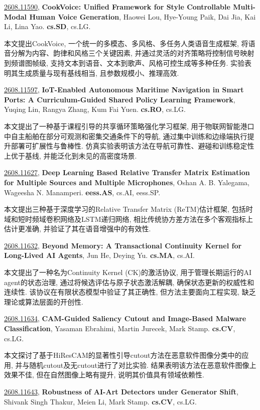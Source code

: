 \documentclass[9pt, a4paper]{article}
\theoremstyle{plain}
\theoremstyle{definition}
\theoremstyle{remark}
\newcommand{\arxivwithtarget}[3]{\hypertarget{#1}{}\href{https://arxiv.org/abs/#1}{#1}, \textbf{\textcolor{arxivblue}{#2}}, #3. }
\begin{document}
\arxivwithtarget{2608.11590}{CookVoice: Unified Framework for Style Controllable Multi-Modal Human Voice Generation}{Haowei Lou, Hye-Young Paik, Dai Jia, Kai Li, Lina Yao}\textbf{cs.SD}, cs.LG.

本文提出CookVoice, 一个统一的多模态、多风格、多任务人类语音生成框架, 将语音分解为内容、韵律和风格三个关键因素, 并通过灵活的对齐策略将控制信号映射到频谱图帧级, 支持文本到语音、文本到歌声、风格可控生成等多种任务. 实验表明其生成质量与现有基线相当, 且参数规模小、推理高效.


\arxivwithtarget{2608.11597}{IoT-Enabled Autonomous Maritime Navigation in Smart Ports: A Curriculum-Guided Shared Policy Learning Framework}{Yuqing Lin, Rangya Zhang, Kum Fai Yuen}\textbf{cs.RO}, cs.LG.

本文提出了一种基于课程引导的共享循环策略强化学习框架, 用于物联网智能港口中自主船舶在部分可观测和密集交通条件下的导航, 通过集中训练和边缘端执行提升部署可扩展性与鲁棒性. 仿真实验表明该方法在导航可靠性、避碰和训练稳定性上优于基线, 并能泛化到未见的高密度场景.


\arxivwithtarget{2608.11627}{Deep Learning Based Relative Transfer Matrix Estimation for Multiple Sources and Multiple Microphones}{Oshan A. B. Yalegama, Wageesha N. Manamperi}\textbf{eess.AS}, cs.AI, eess.SP.

本文提出三种基于深度学习的Relative Transfer Matrix (ReTM)估计框架, 包括时域和短时频域卷积网络及LSTM递归网络, 相比传统协方差方法在多个客观指标上估计更准确, 并验证了其在语音增强中的有效性.


\arxivwithtarget{2608.11632}{Beyond Memory: A Transactional Continuity Kernel for Long-Lived AI Agents}{Jun He, Deying Yu}\textbf{cs.MA}, cs.AI.

本文提出了一种名为Continuity Kernel (CK)的激活协议, 用于管理长期运行的AI agent的状态治理, 通过将候选评估与原子状态激活解耦, 确保状态更新的权威性和连续性. 该协议在有限状态模型中验证了其正确性, 但方法主要面向工程实现, 缺乏理论或算法层面的开创性.


\arxivwithtarget{2608.11634}{CAM-Guided Saliency Cutout and Image-Based Malware Classification}{Yasaman Ebrahimi, Martin Jurecek, Mark Stamp}\textbf{cs.CV}, cs.LG.

本文探讨了基于HiResCAM的显著性引导cutout方法在恶意软件图像分类中的应用, 并与随机cutout及无cutout进行了对比实验. 结果表明该方法在恶意软件图像上效果不佳, 但在自然图像上略有提升, 说明其价值具有领域依赖性.


\arxivwithtarget{2608.11643}{Robustness of AI-Art Detectors under Generator Shift}{Shivank Singh Thakur, Meien Li, Mark Stamp}\textbf{cs.CV}, cs.LG.
\end{document}
